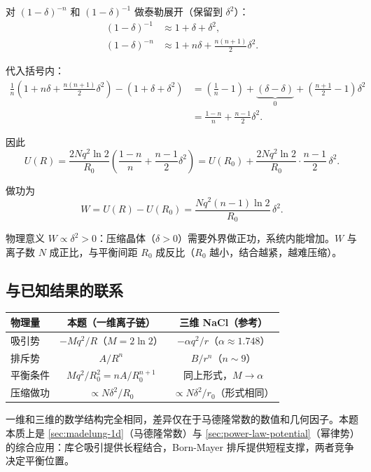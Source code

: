 对 $(1-\delta)^{-n}$ 和 $(1-\delta)^{-1}$ 做泰勒展开（保留到 $\delta^2$）：
\begin{align*}
  (1-\delta)^{-1} &\approx 1 + \delta + \delta^2, \\
  (1-\delta)^{-n} &\approx 1 + n\delta + \frac{n(n+1)}{2}\delta^2.
\end{align*}

代入括号内：
\begin{align*}
  \frac{1}{n}(1+n\delta+\tfrac{n(n+1)}{2}\delta^2) - (1+\delta+\delta^2)
  &= \left(\frac{1}{n}-1\right) + \underbrace{(\delta-\delta)}_{0} + \left(\frac{n+1}{2}-1\right)\delta^2 \\
  &= \frac{1-n}{n} + \frac{n-1}{2}\delta^2.
\end{align*}

因此
\[
  U(R) = \frac{2Nq^2\ln 2}{R_0}\left(\frac{1-n}{n} + \frac{n-1}{2}\delta^2\right)
       = U(R_0) + \frac{2Nq^2\ln 2}{R_0}\cdot\frac{n-1}{2}\,\delta^2.
\]

做功为
\[
  \boxed{ W = U(R) - U(R_0) = \frac{Nq^2(n-1)\ln 2}{R_0}\,\delta^2 }. \tag{4}
\]

\begin{tipbox}{物理意义}
$W \propto \delta^2 > 0$：压缩晶体（$\delta>0$）需要外界做正功，系统内能增加。$W$ 与离子数 $N$ 成正比，与平衡间距 $R_0$ 成反比（$R_0$ 越小，结合越紧，越难压缩）。
\end{tipbox}

\subsection{与已知结果的联系}

\begin{center}
\renewcommand{\arraystretch}{1.5}
\begin{tabular}{|l|c|c|}
\hline
\textbf{物理量} & \textbf{本题（一维离子链）} & \textbf{三维 NaCl（参考）} \\
\hline
吸引势 & $-Mq^2/R$（$M=2\ln 2$） & $-\alpha q^2/r$（$\alpha\approx 1.748$） \\
排斥势 & $A/R^n$ & $B/r^n$（$n\sim 9$） \\
平衡条件 & $Mq^2/R_0^2 = nA/R_0^{n+1}$ & 同上形式，$M\to\alpha$ \\
压缩做功 & $\propto N\delta^2/R_0$ & $\propto N\delta^2/r_0$（形式相同） \\
\hline
\end{tabular}
\end{center}

一维和三维的数学结构完全相同，差异仅在于马德隆常数的数值和几何因子。本题本质上是 \ref{sec:madelung-1d}（马德隆常数）与 \ref{sec:power-law-potential}（幂律势）的综合应用：库仑吸引提供长程结合，Born-Mayer 排斥提供短程支撑，两者竞争决定平衡位置。
